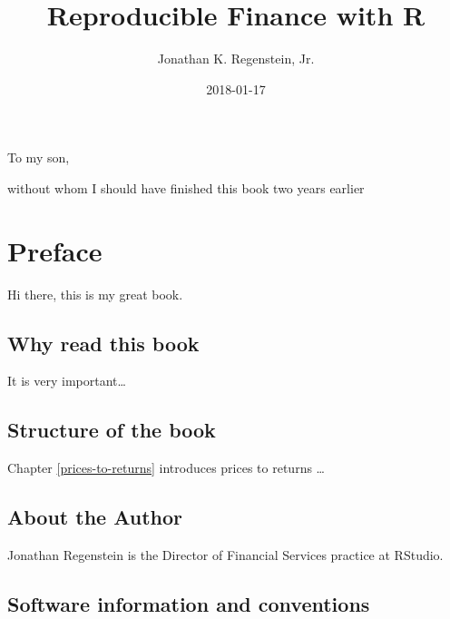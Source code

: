\documentclass[]{krantz}
\title{Reproducible Finance with R}
\author{Jonathan K. Regenstein, Jr.}
\date{2018-01-17}
\begin{document}
\maketitle


\thispagestyle{empty}

\begin{center}
To my son,

without whom I should have finished this book two years earlier
\end{center}

\setlength{\abovedisplayskip}{-5pt}
\setlength{\abovedisplayshortskip}{-5pt}

{
\hypersetup{linkcolor=black}
\setcounter{tocdepth}{0}
\tableofcontents
}
\listoftables
\listoffigures
\chapter*{Preface}\label{preface}


Hi there, this is my great book.

\section*{Why read this book}\label{why-read-this-book}


It is very important\ldots{}

\section*{Structure of the book}\label{structure-of-the-book}


Chapter \ref{prices-to-returns} introduces prices to returns \ldots{}

\section*{About the Author}\label{about-the-author}


Jonathan Regenstein is the Director of Financial Services practice at
RStudio.

\section*{Software information and
conventions}\label{software-information-and-conventions}
\end{document}
